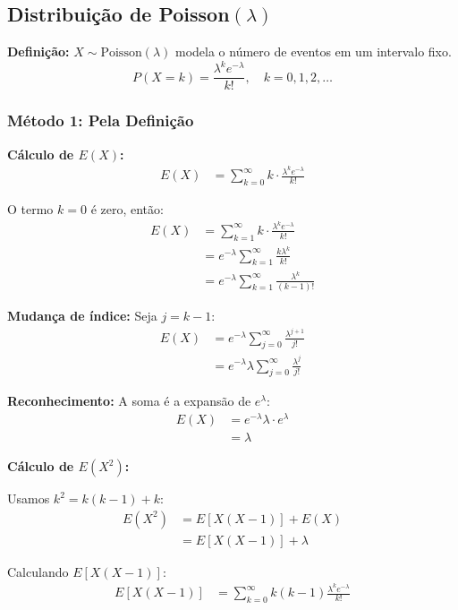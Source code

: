 \documentclass[12pt,a4paper]{article}
\theoremstyle{plain}
\theoremstyle{definition}
\theoremstyle{remark}
\begin{document}
\subsection{Distribuição de Poisson\((\lambda)\)}

\textbf{Definição:} \(X \sim \text{Poisson}(\lambda)\) modela o número de eventos em um intervalo fixo.
\[
P(X = k) = \frac{\lambda^k e^{-\lambda}}{k!}, \quad k = 0, 1, 2, \ldots
\]

\subsubsection{Método 1: Pela Definição}

\textbf{Cálculo de \(E(X)\):}
\begin{align}
E(X) &= \sum_{k=0}^{\infty} k \cdot \frac{\lambda^k e^{-\lambda}}{k!}
\end{align}

O termo \(k=0\) é zero, então:
\begin{align}
E(X) &= \sum_{k=1}^{\infty} k \cdot \frac{\lambda^k e^{-\lambda}}{k!} \\
&= e^{-\lambda} \sum_{k=1}^{\infty} \frac{k \lambda^k}{k!} \\
&= e^{-\lambda} \sum_{k=1}^{\infty} \frac{\lambda^k}{(k-1)!}
\end{align}

\textbf{Mudança de índice:} Seja \(j = k-1\):
\begin{align}
E(X) &= e^{-\lambda} \sum_{j=0}^{\infty} \frac{\lambda^{j+1}}{j!} \\
&= e^{-\lambda} \lambda \sum_{j=0}^{\infty} \frac{\lambda^j}{j!}
\end{align}

\textbf{Reconhecimento:} A soma é a expansão de \(e^{\lambda}\):
\begin{align}
E(X) &= e^{-\lambda} \lambda \cdot e^{\lambda} \\
&= \lambda
\end{align}

\textbf{Cálculo de \(E(X^2)\):}

Usamos \(k^2 = k(k-1) + k\):
\begin{align}
E(X^2) &= E[X(X-1)] + E(X) \\
&= E[X(X-1)] + \lambda
\end{align}

Calculando \(E[X(X-1)]\):
\begin{align}
E[X(X-1)] &= \sum_{k=0}^{\infty} k(k-1) \frac{\lambda^k e^{-\lambda}}{k!}
\end{align}
\end{document}
